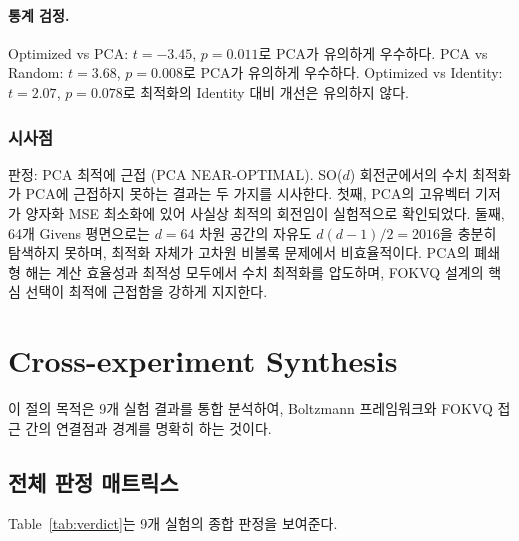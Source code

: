 \documentclass[11pt,a4paper]{article}
\begin{document}
\paragraph{통계 검정.}
Optimized vs PCA: $t = -3.45$, $p = 0.011$로 PCA가 유의하게 우수하다.
PCA vs Random: $t = 3.68$, $p = 0.008$로 PCA가 유의하게 우수하다.
Optimized vs Identity: $t = 2.07$, $p = 0.078$로 최적화의 Identity 대비 개선은 유의하지 않다.

\subsubsection{시사점}

판정: \textcolor{success}{PCA 최적에 근접 (PCA NEAR-OPTIMAL)}.
SO($d$) 회전군에서의 수치 최적화가 PCA에 근접하지 못하는 결과는 두 가지를 시사한다.
첫째, PCA의 고유벡터 기저가 양자화 MSE 최소화에 있어 사실상 최적의 회전임이 실험적으로 확인되었다.
둘째, 64개 Givens 평면으로는 $d=64$ 차원 공간의 자유도 $d(d-1)/2 = 2016$을 충분히 탐색하지 못하며, 최적화 자체가 고차원 비볼록 문제에서 비효율적이다.
PCA의 폐쇄형 해는 계산 효율성과 최적성 모두에서 수치 최적화를 압도하며, FOKVQ 설계의 핵심 선택이 최적에 근접함을 강하게 지지한다.

\section{Cross-experiment Synthesis}

이 절의 목적은 9개 실험 결과를 통합 분석하여, Boltzmann 프레임워크와 FOKVQ 접근 간의 연결점과 경계를 명확히 하는 것이다.

\subsection{전체 판정 매트릭스}

Table~\ref{tab:verdict}는 9개 실험의 종합 판정을 보여준다.
\end{document}
